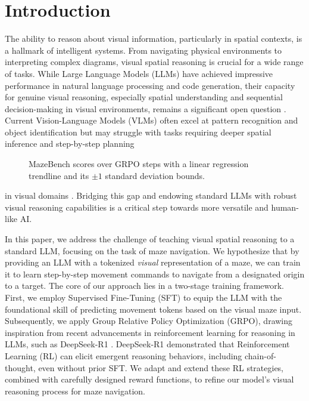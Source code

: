 \section{Introduction}
\label{sec:introduction}

The ability to reason about visual information, particularly in spatial contexts, is a hallmark of intelligent systems. From navigating physical environments to interpreting complex diagrams, visual spatial reasoning is crucial for a wide range of tasks. While Large Language Models (LLMs) have achieved impressive performance in natural language processing and code generation, their capacity for genuine visual reasoning, especially spatial understanding and sequential decision-making in visual environments, remains a significant open question \citep{zhang2024visionlanguagemodelsvisiontasks, ma2024surveyvisionlanguageactionmodelsembodied}. Current Vision-Language Models (VLMs) often excel at pattern recognition and object identification but may struggle with tasks requiring deeper spatial inference and step-by-step planning 


\begin{figure}[htbp]
  \centering
  \resizebox{1.05\linewidth}{!}{}
  \caption{MazeBench scores over GRPO steps with a linear regression trendline and its $\pm1$ standard deviation bounds.}
  \label{fig:maze_plot}
\end{figure}

in visual domains \citep{ma2024surveyvisionlanguageactionmodelsembodied}. Bridging this gap and endowing standard LLMs with robust visual reasoning capabilities is a critical step towards more versatile and human-like AI.


In this paper, we address the challenge of teaching visual spatial reasoning to a standard LLM, focusing on the task of maze navigation. We hypothesize that by providing an LLM with a tokenized \textit{visual} representation of a maze, we can train it to learn step-by-step movement commands to navigate from a designated origin to a target. The core of our approach lies in a two-stage training framework. First, we employ Supervised Fine-Tuning (SFT) to equip the LLM with the foundational skill of predicting movement tokens based on the visual maze input. Subsequently, we apply Group Relative Policy Optimization (GRPO), drawing inspiration from recent advancements in reinforcement learning for reasoning in LLMs, such as DeepSeek-R1 \citep{Guo2025DeepSeekR1}. DeepSeek-R1 demonstrated that Reinforcement Learning (RL) can elicit emergent reasoning behaviors, including chain-of-thought, even without prior SFT. We adapt and extend these RL strategies, combined with carefully designed reward functions, to refine our model's visual reasoning process for maze navigation.

